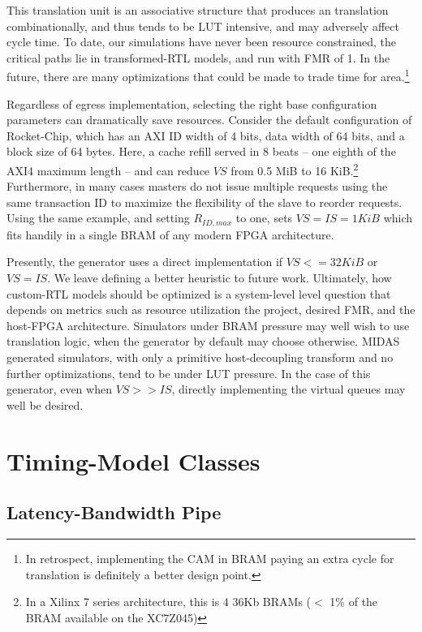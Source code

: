 This translation unit is an associative structure that produces an translation
combinationally, and thus tends to be LUT intensive, and may adversely affect
cycle time. To date, our simulations have never been resource constrained, the
critical paths lie in transformed-RTL models, and run with FMR of 1. In the
future, there are many optimizations that could be made to trade time for
area.\footnote{In retrospect, implementing the CAM in BRAM paying an extra
cycle for translation is definitely a better design point.}

Regardless of egress implementation, selecting the right base configuration
parameters can dramatically save resources. Consider the default configuration
of Rocket-Chip, which has an AXI ID width of 4 bits, data width of 64 bits, and
a block size of 64 bytes. Here, a cache refill served in 8 beats -- one eighth
of the AXI4 maximum length -- and can reduce $VS$ from 0.5 MiB to 16
KiB.\footnote{In a Xilinx 7 series architecture, this is 4 36Kb BRAMs ($<$ 1\%
of the BRAM available on the XC7Z045)} Furthermore, in many cases masters do not
issue multiple requests using the same transaction ID to maximize the
flexibility of the slave to reorder requests. Using the same example, and
setting $R_{ID,max}$ to one, sets $VS = IS = 1 KiB$ which fits handily in a
single BRAM of any modern FPGA architecture.

Presently, the generator uses a direct implementation if $VS <= 32 KiB$ or $VS
= IS$. We leave defining a better heuristic to future work. Ultimately, how
custom-RTL models should be optimized is a system-level level question that
depends on metrics such as resource utilization the project, desired FMR, and
the host-FPGA architecture. Simulators under BRAM pressure may well wish to use
translation logic, when the generator by default may choose otherwise. MIDAS
generated simulators, with only a primitive host-decoupling transform and no
further optimizations, tend to be under LUT pressure. In the case of this
generator, even when $VS >> IS$, directly implementing the virtual queues may
well be desired.

\section{Timing-Model Classes}\label{sec:timing_model}

\subsection{Latency-Bandwidth Pipe}

